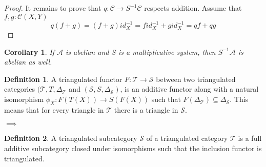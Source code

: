 \documentclass[12pt]{article}
\newtheorem{corollary}{Corollary}[theorem]
\theoremstyle{definition}
\newtheorem{definition}{Definition}[section]
\theoremstyle{remark}
\begin{document}
\begin{proof}
                It remains to prove that $q:\mathcal{C}\rightarrow S^{-1}\mathcal{C}$ respects addition. Assume that $f,g:\mathcal{C}(X,Y)$
                \begin{equation*}
                    q(f+g)=(f+g)id_X^{-1}=fid_X^{-1}+gid_X^{-1}=qf+qg
                \end{equation*} 
            \end{proof}

            \begin{corollary}
                If $\mathcal{A}$ is abelian and $S$ is a multiplicative system, then $S^{-1}\mathcal{A}$ is abelian as well.
            \end{corollary}

            \begin{definition}
                A triangulated functor $F: \mathcal{T} \rightarrow \mathcal{S}$ between two triangulated categories $(\mathcal{T}, T, \Delta_\mathcal{T}$ and $(\mathcal{S}, S, \Delta_\mathcal{S})$, is an additive functor along with a natural isomorphism $\phi_X : F(T(X)) \rightarrow S(F(X))$ such that $F(\Delta_{\mathcal{T}}) \subseteq \Delta_{\mathcal{S}}$. This means that for every triangle in $\mathcal{T}$ there is a triangle in $\mathcal{S}$.
                \begin{center}
                    $\implies$
                \end{center}
            \end{definition}

            \begin{definition}
                A triangulated subcategory $\mathcal{S}$ of a triangulated category $\mathcal{T}$ is a full additive subcategory closed under isomorphisms such that the inclusion functor is triangulated.
            \end{definition}
\end{document}
